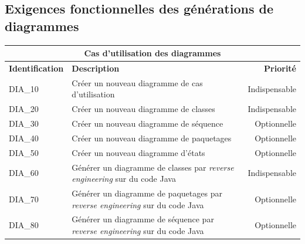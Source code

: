 \documentclass[hidelinks, 10pt,a4paper]{article}
\begin{document}
\subsection{Exigences fonctionnelles des générations de diagrammes}
\begin{center}
    \begin{tabular}{|l|p{8cm}|r|}
        \hline\multicolumn{3}{|c|}{Cas d’utilisation des diagrammes} \\\hline
        {\textbf{Identification}} & {\textbf{Description}} & {\textbf{Priorité}} \\\hline
        {DIA\_10} & {Créer un nouveau diagramme de cas d’utilisation} & {Indispensable} \\\hline
        {DIA\_20} & {Créer un nouveau diagramme de classes} & {Indispensable} \\\hline
        {DIA\_30} & {Créer un nouveau diagramme de séquence} & {Optionnelle} \\\hline
        {DIA\_40} & {Créer un nouveau diagramme de paquetages} & {Optionnelle} \\\hline
        {DIA\_50} & {Créer un nouveau diagramme d’états} & {Optionnelle} \\\hline
        {DIA\_60} & {Générer un diagramme de classes par \textit{reverse engineering} sur du code Java} & {Indispensable} \\\hline
        {DIA\_70} & {Générer un diagramme de paquetages par \textit{reverse engineering} sur du code Java} & {Optionnelle} \\\hline
        {DIA\_80} & {Générer un diagramme de séquence par \textit{reverse engineering} sur du code Java} & {Optionnelle} \\\hline
    \end{tabular}
\end{center}

\newpage
\end{document}
